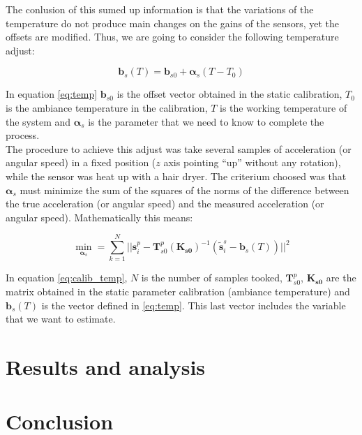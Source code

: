 \documentclass[conference]{IEEEtran}
\begin{document}
The conlusion of this sumed up information is that the variations of the temperature do not produce main changes on the gains of the sensors, yet the offsets are modified. Thus, we are going to consider the following temperature adjust:

\begin{equation}
\mathbf{b}_s(T) = \mathbf{b}_{s0} + \boldsymbol{\alpha}_s (T-T_0)
\label{eq:temp}
\end{equation}

In equation \ref{eq:temp} $\mathbf{b}_{s0}$ is the offset vector obtained in the static calibration, $T_0$ is the ambiance temperature in the calibration, $T$ is the working temperature of the system and $\boldsymbol{\alpha}_s$ is the parameter that we need to know to complete the process.\\ 

The procedure to achieve this adjust was take several samples of acceleration (or angular speed) in a fixed position ($z$ axis pointing ``up'' without any rotation), while the sensor was heat up with a hair dryer. The criterium choosed was that $\boldsymbol{\alpha}_s$ must minimize the sum of the squares of the norms of the difference between the true acceleration (or angular speed) and the measured acceleration (or angular speed). Mathematically this means:

\begin{equation}
\min_{\boldsymbol{\alpha}_s} = \sum_{k=1}^N ||\mathbf{s}_i^p - \mathbf{T}_{s0}^p(\mathbf{K_{s0}})^{-1}(\tilde{\mathbf{s}}_i^s-\mathbf{b}_s(T))||^2 
\label{eq:calib_temp}
\end{equation}

In equation \ref{eq:calib_temp}, $N$ is the number of samples tooked, $\mathbf{T}_{s0}^p$, $\mathbf{K_{s0}}$ are the matrix obtained in the static parameter calibration (ambiance temperature) and $\mathbf{b}_s(T)$ is the vector defined in \ref{eq:temp}. This last vector includes the variable that we want to estimate.\\

\section{Results and analysis}


\section{Conclusion}

\end{document}
